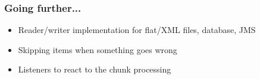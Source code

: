 \begin{frame}
 \frametitle{Going further...}
 \begin{itemize}
  \item Reader/writer implementation for flat/XML files, database, JMS
  \item Skipping items when something goes wrong
  \item Listeners to react to the chunk processing  
 \end{itemize}
\end{frame}

